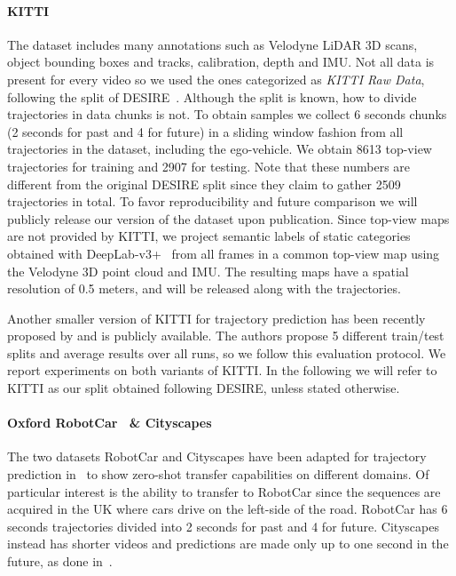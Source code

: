\documentclass[10pt,twocolumn,letterpaper]{article}
\begin{document}
\paragraph{KITTI~\cite{geiger2012we}}
The dataset includes many annotations such as Velodyne LiDAR 3D scans, object bounding boxes and tracks, calibration, depth and IMU. Not all data is present for every video so we used the ones categorized as \textit{KITTI Raw Data}, following the split of DESIRE~\cite{lee2017desire}. Although the split is known, how to divide trajectories in data chunks is not. To obtain samples we collect 6 seconds chunks (2 seconds for past and 4 for future) in a sliding window fashion from all trajectories in the dataset, including the ego-vehicle. We obtain 8613 top-view trajectories for training and 2907 for testing. Note that these numbers are different from the original DESIRE split since they claim to gather 2509 trajectories in total. To favor reproducibility and future comparison we will publicly release our version of the dataset upon publication. Since top-view maps are not provided by KITTI, we project semantic labels of static categories obtained with DeepLab-v3+~\cite{chen2017rethinking} from all frames in a common top-view map using the Velodyne 3D point cloud and IMU. The resulting maps have a spatial resolution of 0.5 meters, and will be released along with the trajectories.

Another smaller version of KITTI for trajectory prediction has been recently proposed by \cite{srikanth2019infer} and is publicly available. The authors propose 5 different train/test splits and average results over all runs, so we follow this evaluation protocol. We report experiments on both variants of KITTI. In the following we will refer to KITTI as our split obtained following DESIRE, unless stated otherwise.

\vspace{-5px}
\paragraph{Oxford RobotCar~\cite{maddern20171} \& Cityscapes~\cite{cordts2016cityscapes}}
The two datasets RobotCar and Cityscapes have been adapted for trajectory prediction in~\cite{srikanth2019infer} to show zero-shot transfer capabilities on different domains. Of particular interest is the ability to transfer to RobotCar since the sequences are acquired in the UK where cars drive on the left-side of the road. RobotCar has 6 seconds trajectories divided into 2 seconds for past and 4 for future. Cityscapes instead has shorter videos and predictions are made only up to one second in the future, as done in~\cite{srikanth2019infer}.
\end{document}

